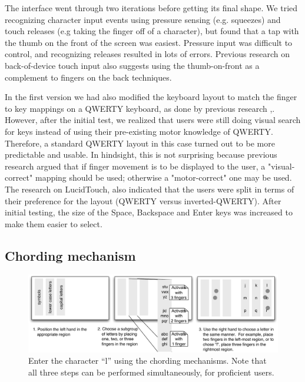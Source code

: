 The interface went through two iterations before getting its final
shape.  We tried recognizing character input events using pressure
sensing (e.g. squeezes) and touch releases (e.g taking the finger off
of a character), but found that a tap with the thumb on the front of
the screen was easiest.  Pressure input was difficult to control, and
recognizing releases resulted in lots of errors.  Previous research on
back-of-device touch input also suggests using the thumb-on-front as a
complement to fingers on the back techniques. \cite{Wobbrock}

In the first version we had also modified the keyboard layout to match the finger to key mappings on a QWERTY keyboard, as done by previous research \cite{RearType},\cite{LucidTouch}. However, after the initial test, we realized that users were still doing visual search for keys instead of using their pre-existing motor knowledge of QWERTY. Therefore, a standard QWERTY layout in this case turned out to be more predictable and usable. In hindsight, this is not surprising because previous research \cite{Wobbrock} argued that if finger movement is to be displayed to the user, a "visual-correct" mapping should be used; otherwise a "motor-correct" one may be used. The research on LucidTouch, also indicated that the users were split in terms of their preference for the layout (QWERTY versus inverted-QWERTY). After initial testing, the size of the Space, Backspace and Enter keys was increased to make them easier to select.

\subsection{Chording mechanism}
\begin{figure}
    \includegraphics[width=\textwidth]{Figures/chording_explaination.pdf} 
    \caption{Enter the character ``l'' using the chording mechanisms.
      Note that all three steps can be performed simultaneously, for
      proficient users.}
    \label{fig:chording_explanation}
\end{figure} 

